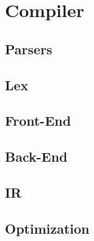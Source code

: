 \section{Compiler}
\subsection{Parsers}
\subsection{Lex}
\subsection{Front-End}
\subsection{Back-End}
\subsection{IR}
\subsection{Optimization}


